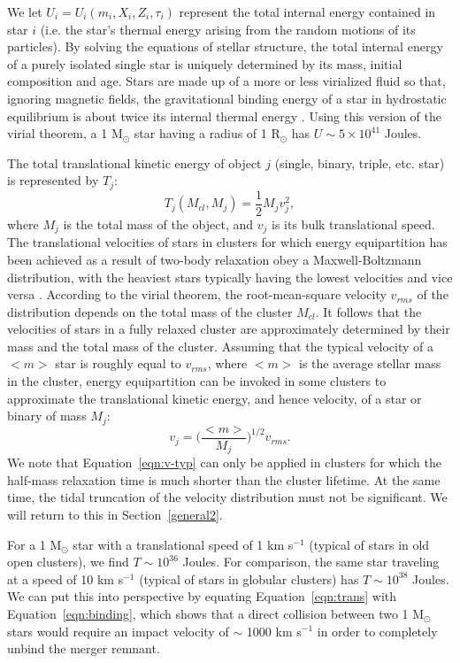 We let $U_i = U_i(m_i,X_i,Z_i,\tau_i)$ represent the total internal
energy contained in star $i$ (i.e. the star's thermal energy
arising from the random motions of its particles).  By solving the
equations of stellar 
structure, the total internal energy of a purely isolated single star
is uniquely determined by its mass, initial composition and age.  
Stars are made up of a more or less virialized fluid so
that, ignoring magnetic fields, the gravitational binding energy of a
star in hydrostatic
equilibrium is about twice its internal thermal energy
\citep{chandrasekhar39}.  Using this version of the virial theorem, a
1 M$_{\odot}$ star having a radius of 1 R$_{\odot}$ has $U \sim 5
\times 10^{41}$ Joules. 

The total translational kinetic energy of object $j$ (single, binary,
triple, etc. star) is represented by $T_j$:
\begin{equation}
\label{eqn:trans}
T_j(M_{cl},M_j) = \frac{1}{2}M_jv_j^2,
\end{equation} 
where $M_j$ is the total mass of the object, 
and $v_j$ is its bulk translational speed.  The
translational velocities of stars in clusters for which energy
equipartition has been achieved as a result of two-body relaxation
obey a Maxwell-Boltzmann distribution, with the heaviest stars
typically having the lowest velocities and vice versa
\citep{spitzer87}.  According to
the virial theorem, the root-mean-square velocity $v_{rms}$ of the
distribution depends on the total mass of the cluster $M_{cl}$.  It 
follows that the velocities of stars in a fully relaxed cluster
are approximately determined by their mass and the total mass of the
cluster.  Assuming that the typical velocity of 
a $<m>$ star is roughly equal to $v_{rms}$,
where $<m>$ is the average stellar mass in the cluster, 
energy equipartition can be invoked in some clusters to approximate
the translational 
kinetic energy, and hence velocity, of a star or binary of mass $M_j$:
\begin{equation}
\label{eqn:v-typ}
v_j = \Big( \frac{<m>}{M_j} \Big)^{1/2}v_{rms}.
\end{equation}
We note that Equation~\ref{eqn:v-typ} can only be applied in clusters
for which the half-mass relaxation time is much shorter than the
cluster lifetime.  At the same time, the tidal truncation of the
velocity distribution must not be significant.  We will return to this
in Section~\ref{general2}.  

For a 1 M$_{\odot}$ star with a 
translational speed of 1 km s$^{-1}$ (typical of stars in old open
clusters), we find $T \sim 10^{36}$ Joules.  For comparison, the same
star traveling at a speed of 10 km s$^{-1}$ (typical of stars in
globular clusters) has $T \sim 10^{38}$ Joules.  We can put this into
perspective by equating Equation~\ref{eqn:trans} with
Equation~\ref{eqn:binding}, which shows that
a direct collision between two 1 M$_{\odot}$ stars would require an
impact velocity of $\sim$ 1000 km s$^{-1}$ in order to completely
unbind the merger remnant.


